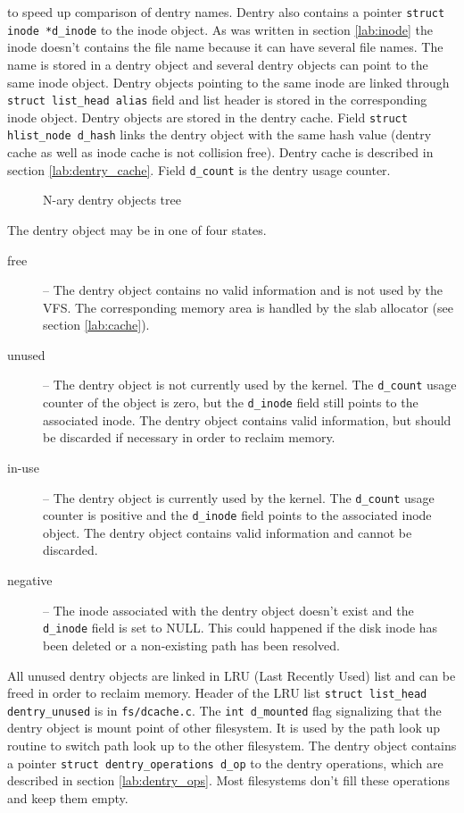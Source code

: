 to speed up comparison of dentry names. Dentry also contains a pointer \texttt{struct
inode *d\_inode} to the inode object. As was written in section \ref{lab:inode} the inode
doesn't contains the file name because it can have several file names. The name is stored
in a dentry object and several dentry objects can point to the same inode object.
Dentry objects pointing to the same inode are linked through \texttt{struct
list\_head alias} field and list header is stored in the corresponding inode object.
Dentry objects are stored in the dentry cache. Field \texttt{struct hlist\_node
d\_hash} links the dentry object with the same hash value (dentry cache as well as
inode cache is not collision free). Dentry cache is described in section
\ref{lab:dentry_cache}. Field \texttt{d\_count} is the dentry usage counter.

\begin{figure}[hp]
	\begin{center}
		
	\end{center}
	\caption{N-ary dentry objects tree}
	\label{fig:vfs_dentry}
\end{figure}

\newpage
The dentry object may be in one of four states.
\begin{description}
	\item[free] -- The dentry object contains no valid information and is not used
		by the VFS. The corresponding memory area is handled by the slab
		allocator (see section \ref{lab:cache}).
	\item[unused] -- The dentry object is not currently used by the kernel. The
		\texttt{d\_count} usage counter of the object is zero, but the
		\texttt{d\_inode} field still points to the associated inode. The
		dentry object contains valid information, but should be discarded if
		necessary in order to reclaim memory.
	\item[in-use] -- The dentry object is currently used by the kernel. The
		\texttt{d\_count} usage counter is positive and the \texttt{d\_inode}
		field points to the associated inode object. The dentry object
		contains valid information and cannot be discarded.
	\item[negative] -- The inode associated with the dentry object doesn't exist
		and the \texttt{d\_inode} field is set to NULL. This could happened if the
		disk inode has been deleted or a non-existing path has been resolved.
\end{description}

All unused dentry objects are linked in LRU (Last Recently Used) list and can be freed
in order to reclaim memory. Header of the LRU list \texttt{struct list\_head
dentry\_unused} is in \texttt{fs/dcache.c}. The \texttt{int d\_mounted} flag
signalizing that the dentry object is mount point of other filesystem. It is used by
the path look up routine to switch path look up to the other filesystem. The dentry object
contains a pointer \texttt{struct dentry\_operations d\_op} to the dentry operations,
which are described in section \ref{lab:dentry_ops}.
Most filesystems don't fill these operations and keep them empty.

